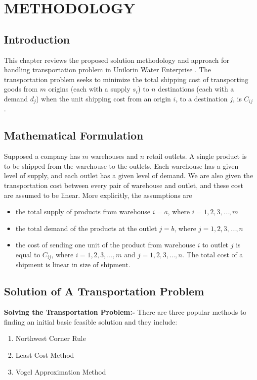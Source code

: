 \documentclass[12pt]{report}
\newcommand{\bt}[1]{\textbf{#1}}
\newcommand{\NI}{\noindent}
\newcommand{\tp}{Transportation Problem }
\newcommand{\stp}{transportation problem }
\newcommand{\uwe}{Unilorin Water Enterprise }
\begin{document}
	\chapter{METHODOLOGY}
	
	\section{Introduction}
	This chapter reviews the proposed solution methodology and approach for handling transportation problem in \uwe. The \stp seeks to minimize the total shipping cost of transporting goods from  $m$ origins (each with a supply $s_i$) to $n$ destinations (each with a demand $d_j$) when the unit shipping cost from an origin $i$, to a destination $j$, is $C_{ij}$.
	
	\section{Mathematical Formulation}
	Supposed a company has $m$ warehouses and $n$ retail outlets. A single product is to be shipped from the warehouse to the outlets. Each warehouse has a given level of supply, and each outlet has a given level of demand. We are also given the transportation cost between every pair of warehouse and outlet, and these cost are assumed to be linear. More explicitly, the assumptions are
	\begin{itemize}
		\item the total supply of products from warehouse $i=a$, where $i=1,2,3,\ldots, m$
		\item the total demand of the products at the outlet $j=b$, where $j=1,2,3,\ldots, n$
		\item the cost of sending one unit of the product from warehouse $i$ to outlet $j$ is equal to $C_{ij}$, where $i=1,2,3,\ldots,m$ and $j=1,2,3,\ldots,n$. The total cost of a shipment is linear in size of shipment.
	\end{itemize}
	

	

	\section{Solution of A \tp}
	\NI \bt{Solving the Transportation Problem:-} There are three popular methods to finding an initial basic feasible solution and they include:
	\begin{enumerate}
		\renewcommand{\labelenumi}{(\arabic{enumi})}
		\item Northwest Corner Rule
		\item Least Cost Method
		\item Vogel Approximation Method
	\end{enumerate}
	
\end{document}

